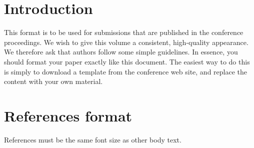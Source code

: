 \documentclass{sigchi}
\begin{document}
\section{Introduction}

This format is to be used for submissions that are
published in the conference proceedings.  We wish to give
this volume a consistent, high-quality appearance. We
therefore ask that authors follow some simple
guidelines. In essence, you should format your paper
exactly like this document. The easiest way to do this is
simply to download a template from the conference web
site, and replace the content with your own material.
%
%


\section{References format}
References must be the same font size as other body text.


\end{document}
